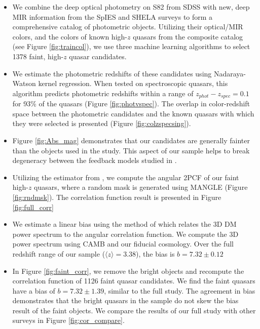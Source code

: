 \documentclass[apj, numberedappendix]{emulateapj}
\begin{document}
\begin{itemize}
    \item{We combine the deep optical photometry on S82 from SDSS with new, deep MIR information from the SpIES and SHELA surveys to form a comprehensive catalog of photometric objects. Utilizing their optical/MIR colors, and the colors of known high-$z$ quasars from the \citet{Richards2015} composite catalog (see Figure \ref{fig:traincol}), we use three machine learning algorithms to select 1378 faint, high-$z$ quasar candidates.}

    \item{We estimate the photometric redshifts of these candidates using Nadaraya-Watson kernel regression. When tested on spectroscopic quasars, this algorithm predicts photometric redshifts within a range of $z_{phot}-z_{spec} = 0.1$ for 93\% of the quasars (Figure \ref{fig:photvspec}). The overlap in color-redshift space between the photometric candidates and the known quasars with which they were selected is presented (Figure \ref{fig:colzspecsing}).}

    \item{Figure \ref{fig:Abs_mag} demonstrates that our candidates are generally fainter than the objects used in the \citet{Shen2007} study. This aspect of our sample helps to break degeneracy between the feedback models studied in \citet{Hopkins2007}.}

    \item{Utilizing the estimator from \citet{Landy1993}, we compute the angular 2PCF of our faint high-$z$ quasars, where a random mask is generated using MANGLE (Figure \ref{fig:rndmsk}). The correlation function result is presented in Figure \ref{fig:full_corr}}
    
    \item{We estimate a linear bias using the method of \citet{Limber1953} which relates the 3D DM power spectrum to the angular correlation function. We compute the 3D power spectrum using CAMB and our fiducial cosmology. Over the full redshift range of our sample ($\langle z \rangle=3.38$), the bias is $b=7.32 \pm 0.12$}
    
    \item{In Figure \ref{fig:faint_corr}, we remove the bright objects and recompute the correlation function of 1126 faint quasar candidates. We find the faint quasars have a bias of $b=7.32 \pm 1.39$, similar to the full study. The agreement in bias demonstrates that the bright quasars in the sample do not skew the bias result of the faint objects. We compare the results of our full study with other surveys in Figure \ref{fig:cor_compare}.}
    

\end{itemize}
\end{document}
